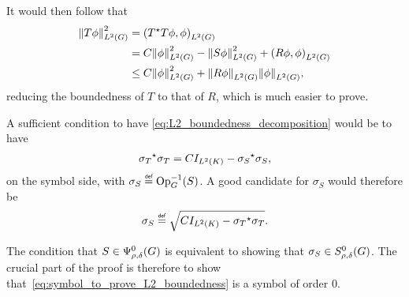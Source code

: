 It would then follow that
\begin{align*}
    \norm [\Lebesgue 2 \Group] {T \phi}^2
    &= \ip [\Lebesgue 2 \Group] {\adj T T \phi} \phi\\
    &= C \norm [\Lebesgue 2 \Group] {\phi}^2 - \norm [\Lebesgue 2 \Group] {S \phi}^2 + \ip [\Lebesgue 2 \Group] {R \phi} \phi\\
    &\leq C \norm [\Lebesgue 2 \Group] {\phi}^2 + \norm [\Lebesgue 2 \Group] {R \phi} \norm [\Lebesgue 2 \Group] \phi,
\end{align*}
reducing the boundedness of $T$ to that of $R$,
which is much easier to prove.

A sufficient condition to have \eqref{eq:L2_boundedness_decomposition} would be to have
\begin{align*}
    \adj {\sigma_T} \sigma_T = C \Id {\Lebesgue 2 \CompactGroup} - \adj {\sigma_S} \sigma_S,
\end{align*}
on the symbol side,
with $\sigma_S \defeq \Op^{-1}(S)$.
A good candidate for $\sigma_S$ would therefore be
\begin{align}
    \sigma_S \defeq \sqrt{C \Id {\Lebesgue 2 \CompactGroup} - \adj {\sigma_T} \sigma_T}.
    \label{eq:symbol_to_prove_L2_boundedness}
\end{align}

The condition that $S \in \OperatorClass 0 {\rho, \delta}$ is equivalent to showing
that $\sigma_S \in \SymbolClass 0 {\rho, \delta}$.
The crucial part of the proof is therefore to show that~\eqref{eq:symbol_to_prove_L2_boundedness} is a symbol of order $0$.

